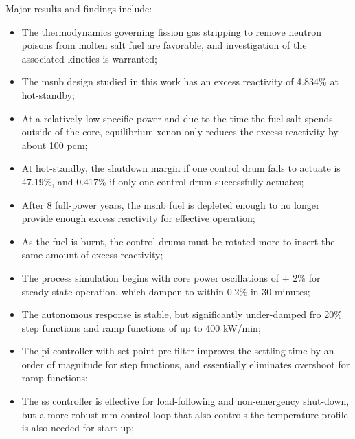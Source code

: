 Major results and findings include:
\begin{itemize}
    \item The thermodynamics governing fission gas stripping to remove neutron poisons from molten salt fuel are favorable, and investigation of the associated kinetics is warranted;
    \item The \acs{msnb} design studied in this work has an excess reactivity of 4.834\% at hot-standby;
    \item At a relatively low specific power and due to the time the fuel salt spends outside of the core, equilibrium xenon only reduces the excess reactivity by about 100 pcm;
    \item At hot-standby, the shutdown margin if one control drum fails to actuate is 47.19\%, and 0.417\% if only one control drum successfully actuates;
    \item After 8 full-power years, the \acs{msnb} fuel is depleted enough to no longer provide enough excess reactivity for effective operation;
    \item As the fuel is burnt, the control drums must be rotated more to insert the same amount of excess reactivity;
    \item The process simulation begins with core power oscillations of $\pm$ 2\% for steady-state operation, which dampen to within 0.2\% in 30 minutes;
    \item The autonomous response is stable, but significantly under-damped fro 20\% step functions and ramp functions of up to 400 kW/min;
    \item The \acs{pi} controller with set-point pre-filter improves the settling time by an order of magnitude for step functions, and essentially eliminates overshoot for ramp functions;
    \item The \acs{ss} controller is effective for load-following and non-emergency shut-down, but a more robust \acs{mm} control loop that also controls the temperature profile is also needed for start-up;
\end{itemize}